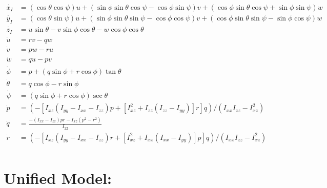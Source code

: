 \documentclass{article}
\begin{document}
\begin{align*}
  \dot{x_I} &= (\cos \theta \cos \psi) u + (\sin \phi \sin \theta \cos \psi -
  \cos \phi \sin \psi) v + (\cos \phi \sin \theta \cos \psi + \sin \phi \sin
  \psi)
  w \\
  \dot{y_I} &= (\cos \theta \sin \psi) u + (\sin \phi \sin \theta \sin \psi -
  \cos \phi \cos \psi) v + (\cos \phi \sin \theta \sin \psi - \sin \phi \cos
  \psi)
  w \\
  \dot{z_I} &= u \sin \theta - v \sin \phi \cos \theta - w \cos \phi \cos
  \theta \\
  \dot{u} &= rv - qw \\
  \dot{v} &= pw - ru \\
  \dot{w} &= qu - pv \\
  \dot{\phi} &= p + (q \sin \phi  + r \cos \phi) \tan \theta \\
  \dot{\theta} &= q \cos \phi -r \sin \phi  \\
  \dot{\psi} &= (q \sin \phi + r \cos \phi ) \sec \theta \\
  \dot{p} &= \left (- [I_{xz}(I_{yy} -
    I_{xx}-I_{zz})p + [I^2_{xz}
    + I_{zz}(I_{zz} - I_{yy})]r]q \right ) / (I_{xx} I_{zz} - I^2_{xz}) \\
  \dot{q} &= \frac{-(I_{xx} - I_{zz})pr - I_{xz}(p^2-r^2)}{I_{22}} \\
 \dot{r} &= \left (- [I_{xz}(I_{yy} -
    I_{xx}-I_{zz})r +
    [I^2_{xz} + I_{xx}(I_{xx} - I_{yy})]p]q\right ) / (I_{xx} I_{zz} - I^2_{xz}) \\
\end{align*}
 



\section{Unified Model:}
\end{document}
